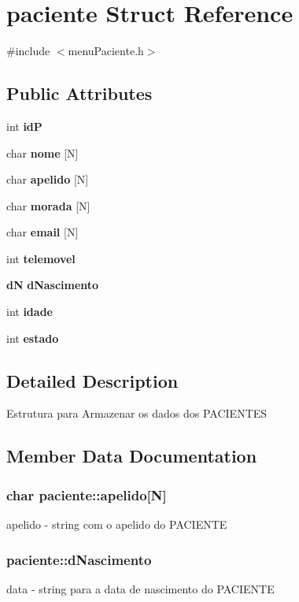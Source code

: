 \section{paciente Struct Reference}
\label{structpaciente}


{\ttfamily \#include $<$menu\+Paciente.\+h$>$}

\subsection*{Public Attributes}
\begin{DoxyCompactItemize}
\item 
int {\bf id\+P}
\item 
char {\bf nome} [N]
\item 
char {\bf apelido} [N]
\item 
char {\bf morada} [N]
\item 
char {\bf email} [N]
\item 
int {\bf telemovel}
\item 
{\bf d\+N} {\bf d\+Nascimento}
\item 
int {\bf idade}
\item 
int {\bf estado}
\end{DoxyCompactItemize}


\subsection{Detailed Description}
Estrutura para Armazenar os dados dos P\+A\+C\+I\+E\+N\+T\+E\+S 

\subsection{Member Data Documentation}
\subsubsection[{apelido}]{\setlength{\rightskip}{0pt plus 5cm}char paciente\+::apelido[N]}\label{structpaciente_a68cf080512cb9b21d1eb198ab7239ef5}
apelido -\/ string com o apelido do P\+A\+C\+I\+E\+N\+T\+E 
\subsubsection[{d\+Nascimento}]{ paciente\+::d\+Nascimento}\label{structpaciente_a023242d132c7b1ff2022957dc850d52c}
data -\/ string para a data de nascimento do P\+A\+C\+I\+E\+N\+T\+E 

